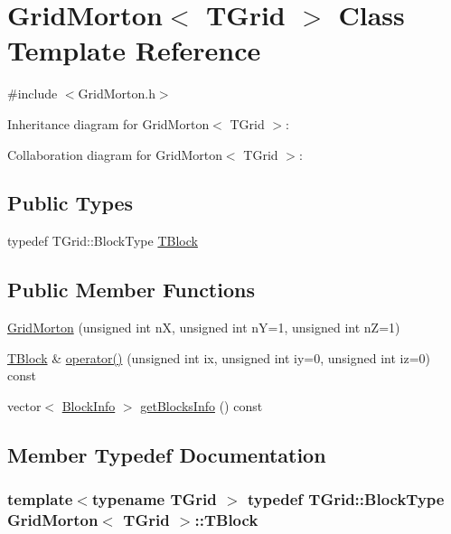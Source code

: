 \hypertarget{class_grid_morton}{}\section{Grid\+Morton$<$ T\+Grid $>$ Class Template Reference}
\label{class_grid_morton}


{\ttfamily \#include $<$Grid\+Morton.\+h$>$}



Inheritance diagram for Grid\+Morton$<$ T\+Grid $>$\+:


Collaboration diagram for Grid\+Morton$<$ T\+Grid $>$\+:
\subsection*{Public Types}
\begin{DoxyCompactItemize}
\item 
typedef T\+Grid\+::\+Block\+Type \hyperlink{class_grid_morton_a015e2b8a69c60cf84a8f1b5b42ce5b1c}{T\+Block}
\end{DoxyCompactItemize}
\subsection*{Public Member Functions}
\begin{DoxyCompactItemize}
\item 
\hyperlink{class_grid_morton_a811a018e13f854a40dbbbc17ba50e13b}{Grid\+Morton} (unsigned int n\+X, unsigned int n\+Y=1, unsigned int n\+Z=1)
\item 
\hyperlink{class_grid_morton_a015e2b8a69c60cf84a8f1b5b42ce5b1c}{T\+Block} \& \hyperlink{class_grid_morton_a5c224b606ea7e4ad490430f3d3ff2d8c}{operator()} (unsigned int ix, unsigned int iy=0, unsigned int iz=0) const 
\item 
vector$<$ \hyperlink{struct_block_info}{Block\+Info} $>$ \hyperlink{class_grid_morton_a78bda35a781c2ffb48dadcac1e59a901}{get\+Blocks\+Info} () const 
\end{DoxyCompactItemize}


\subsection{Member Typedef Documentation}
\hypertarget{class_grid_morton_a015e2b8a69c60cf84a8f1b5b42ce5b1c}{}
\subsubsection[{T\+Block}]{\setlength{\rightskip}{0pt plus 5cm}template$<$typename T\+Grid $>$ typedef T\+Grid\+::\+Block\+Type {\bf Grid\+Morton}$<$ T\+Grid $>$\+::{\bf T\+Block}}\label{class_grid_morton_a015e2b8a69c60cf84a8f1b5b42ce5b1c}



